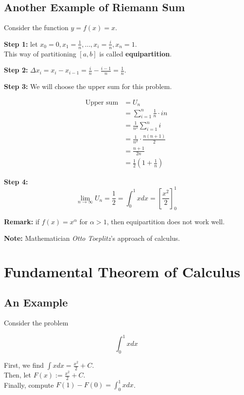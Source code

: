 \subsection{Another Example of Riemann Sum}

Consider the function $y = f(x) = x$.

\textbf{Step 1:} let $x_0 = 0, x_1 = \frac{1}{n}, \dots, x_i = \frac{i}{n}, x_n = 1$.\\
This way of partitioning $[a, b]$ is called \textbf{equipartition}.

\textbf{Step 2:} $\Delta x_i = x_i - x_{i - 1} = \frac{i}{n} - \frac{i - 1}{n} = \frac{1}{n}$.

\textbf{Step 3:} We will choose the upper sum for this problem.

\begin{equation*}
\begin{split}
    \text{Upper sum}
    &= U_n\\
    &= \sum_{i=1}^n \frac{1}{n} \cdot {i}{n}\\
    &= \frac{1}{n^2} \sum_{i=1}^n i\\
    &= \frac{1}{n^2} \cdot \frac{n(n+1)}{2}\\
    &= \frac{n + 1}{2n}\\
    &= \frac{1}{2} (1 + \frac{1}{n})
\end{split}
\end{equation*}

\textbf{Step 4:} 
$$\lim_{n\to\infty} U_n = \frac{1}{2} = \int_0^1 x dx = \left[\frac{x^2}{2}\right]_0^1 $$

\textbf{Remark:} if $f(x) = x^\alpha$ for $\alpha > 1$, then equipartition does not work well.

\textbf{Note:} Mathematician \textit{Otto Toeplitz}'s approach of calculus. 

\section{Fundamental Theorem of Calculus}

\subsection{An Example}

Consider the problem

$$ \int_0^1 x dx $$

First, we find $\int x dx = \frac{x^2}{2} + C$.\\
Then, let $F(x) := \frac{x^2}{2} + C$.\\
Finally, compute $F(1) - F(0) = \int_0^1 x dx$.

